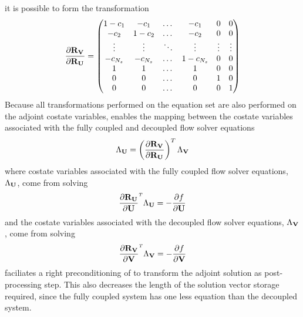 it is possible to form the transformation
\begin{equation}
  \frac{\partial \mathbf R_{{\mathbf V}_{}}}{\partial \mathbf R_{{\mathbf U}_{}}} =
  \begin{pmatrix}
    1 - c_1  & -c_1     & \dots  & -c_1      & 0      & 0      \\
    -c_2     & 1-c_2    & \dots  & -c_2      & 0      & 0      \\
    \vdots   & \vdots   & \ddots & \vdots    & \vdots & \vdots \\
    -c_{N_s} & -c_{N_s} & \dots  & 1-c_{N_s} & 0      & 0      \\
    1        & 1        & \dots  & 1         & 0      & 0      \\
    0        & 0        & \dots  & 0         & 1      & 0      \\
    0        & 0        & \dots  & 0         & 0      & 1      \\
  \end{pmatrix}
  \label{drudrv}
\end{equation}
Because all transformations performed on the equation set are also performed
on the adjoint costate variables,  enables the mapping between the
costate variables associated with the fully coupled and decoupled flow solver
equations
\begin{equation}
  \Lambda_{\mathbf U} = \left(\frac{\partial \mathbf R_{{\mathbf V}_{}}}{\partial \mathbf R_{{\mathbf U}_{}}} \right)^{T} \Lambda_{\mathbf V}
  \label{adj-ru-to-rv}
\end{equation}
where costate variables associated with the fully coupled flow solver equations,
$\Lambda_{\mathbf U}$, come from solving
\begin{equation}
  \drudu \adjlam{\mU} = -\pd{f}{\mU}
  \label{fc-adjoint}
\end{equation}
and the costate variables associated with the decoupled flow solver equations,
$\Lambda_{\mathbf V}$, come from solving
\begin{equation}
  \drvdv \adjlam{\mv} = -\pd{f}{\mv}
  \label{dc-adjoint}
\end{equation}
 faciliates a right preconditioning of  to
transform the adjoint solution as post-processing step.  This also decreases the
length of the solution vector storage required, since the fully coupled system
has one less equation than the decoupled system.

